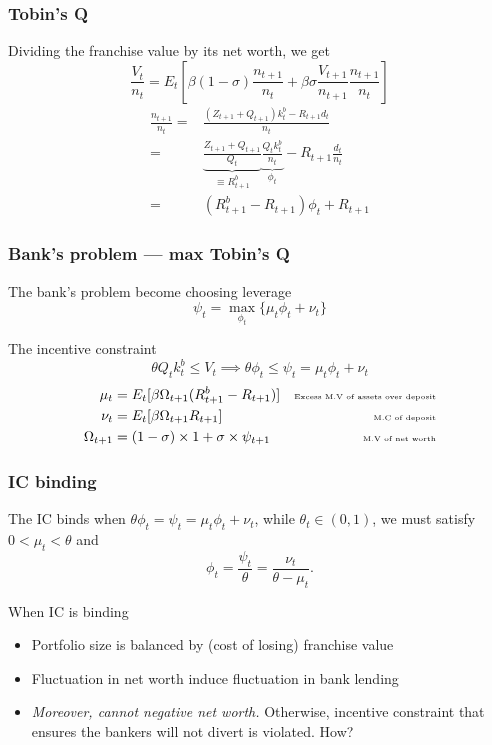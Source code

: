 \begin{frame}
    \frametitle{Tobin's Q}

    Dividing the franchise value by its net worth, we get 
    \begin{equation*}
        \frac{V_t}{n_t} = E_t\left[
            \beta(1-\sigma)\frac{n_{t+1}}{n_t} +\beta\sigma \frac{V_{t+1}}{n_{t+1}}\frac{n_{t+1}}{n_t}
            \right]
    \end{equation*}
    \begin{align}
        \frac{n_{t+1}}{n_t} =& \frac{(Z_{t+1} + Q_{t+1}) k^b_{t} - R_{t+1}d_{t}}{n_t} \nonumber \\
        =& \underbrace{\frac{Z_{t+1} + Q_{t+1}}{Q_{t}}}_{\equiv R^b_{t+1}} \underbrace{\frac{Q_t k^b_t}{n_t}}_{\phi_t} - R_{t+1} \frac{d_t}{n_t} \nonumber \\
        =& (R^b_{t+1} - R_{t+1})\phi_t + R_{t+1}
    \end{align}
\end{frame}

\begin{frame}
    \frametitle{Bank's problem --- max Tobin's Q}
    The bank's problem become choosing leverage 
    \begin{equation}
        \psi_t = \max_{\phi_t} \{\mu_t\phi_t + \nu_t\}
    \end{equation}

    The incentive constraint 
    \begin{equation}
        \theta Q_t k^b_t \le V_t \implies \theta \phi_t \le \psi_t = \mu_t\phi_t + \nu_t
    \end{equation}
    \begin{align}
        \mu_t &= E_t [\beta\Omega_{t+1}(R^b_{t+1} - R_{t+1})] & \text{\tiny Excess M.V of assets over deposit}\\
        \nu_t &= E_t [\beta\Omega_{t+1}R_{t+1}] & \text{\tiny M.C of deposit} \\
        \Omega_{t+1} &= (1-\sigma)\times 1 + \sigma \times \psi_{t+1} & \text{\tiny M.V of net worth} \nonumber
    \end{align}

\end{frame}

\begin{frame}
    \frametitle{IC binding}
    The IC binds when $\theta \phi_t = \psi_t = \mu_t\phi_t + \nu_t$, while $\theta_t \in (0,1)$, 
    we must satisfy $0 < \mu_t < \theta $ and 
    \begin{equation}
        \phi_t = \frac{\psi_t}{\theta} = \frac{\nu_t}{\theta - \mu_t}.
    \end{equation}

    When IC is binding
    \begin{itemize}
        \item Portfolio size is balanced by (cost of losing) franchise value
        \item Fluctuation in net worth induce fluctuation in bank lending
        \item \emph{Moreover, cannot negative net worth. } Otherwise, incentive constraint that ensures the bankers will not divert is violated. How?
    \end{itemize}
\end{frame}